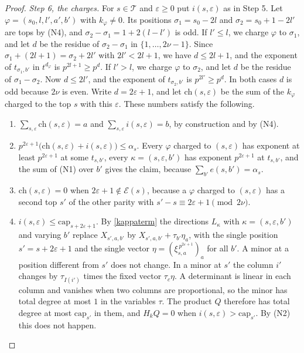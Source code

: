 \begin{proof}
\emph{Step 6, the charges.} For $s\in\mathcal T$ and $\varepsilon\ge0$ put $i(s,\varepsilon)$ as in Step 5. Let $\varphi=(s_0,l,l',a',b')$ with $k_\varphi\ne0$. Its positions $\sigma_1=s_0-2l$ and $\sigma_2=s_0+1-2l'$ are tops by (N4), and $\sigma_2-\sigma_1=1+2(l-l')$ is odd. If $l'\le l$, we charge $\varphi$ to $\sigma_1$, and let $d$ be the residue of $\sigma_2-\sigma_1$ in $\{1,\dots,2\nu-1\}$. Since $\sigma_1+(2l+1)=\sigma_2+2l'$ with $2l'<2l+1$, we have $d\le2l+1$, and the exponent of $t_{\sigma_1,b'}$ in $t^{d_\varphi}$ is $p^{2l+1}\ge p^{d}$. If $l'>l$, we charge $\varphi$ to $\sigma_2$, and let $d$ be the residue of $\sigma_1-\sigma_2$. Now $d\le2l'$, and the exponent of $t_{\sigma_2,b'}$ is $p^{2l'}\ge p^d$. In both cases $d$ is odd because $2\nu$ is even. Write $d=2\varepsilon+1$, and let $\mathrm{ch}(s,\varepsilon)$ be the sum of the $k_\varphi$ charged to the top $s$ with this $\varepsilon$. These numbers satisfy the following.
\begin{enumerate}
\item[(C1)] $\sum_{s,\varepsilon}\mathrm{ch}(s,\varepsilon)=a$ and $\sum_{s,\varepsilon}i(s,\varepsilon)=b$, by construction and by (N4).
\item[(C2)] $p^{2\varepsilon+1}\big(\mathrm{ch}(s,\varepsilon)+i(s,\varepsilon)\big)\le\alpha_s$. Every $\varphi$ charged to $(s,\varepsilon)$ has exponent at least $p^{2\varepsilon+1}$ at some $t_{s,b'}$, every $\kappa=(s,\varepsilon,b')$ has exponent $p^{2\varepsilon+1}$ at $t_{s,b'}$, and the sum of (N1) over $b'$ gives the claim, because $\sum_{b'}e(s,b')=\alpha_s$.
\item[(C3)] $\mathrm{ch}(s,\varepsilon)=0$ when $2\varepsilon+1\notin\mathcal E(s)$, because a $\varphi$ charged to $(s,\varepsilon)$ has a second top $s'$ of the other parity with $s'-s\equiv2\varepsilon+1\pmod{2\nu}$.
\item[(C4)] $i(s,\varepsilon)\le\mathrm{cap}_{s+2\varepsilon+1}$. By \eqref{kappaterm} the directions $L_\kappa$ with $\kappa=(s,\varepsilon,b')$ and varying $b'$ replace $X_{s',a,b'}$ by $X_{s',a,b'}+\tau_{b'}\eta_a$, with the single position $s'=s+2\varepsilon+1$ and the single vector $\eta=(\xi_{s,a}^{\,p^{2\varepsilon+1}})_a$ for all $b'$. A minor at a position different from $s'$ does not change. In a minor at $s'$ the column $i'$ changes by $\tau_{I(i')}$ times the fixed vector $\tau_c\eta$. A determinant is linear in each column and vanishes when two columns are proportional, so the minor has total degree at most $1$ in the variables $\tau$. The product $Q$ therefore has total degree at most $\mathrm{cap}_{s'}$ in them, and $H_kQ=0$ when $i(s,\varepsilon)>\mathrm{cap}_{s'}$. By (N2) this does not happen.
\end{enumerate}


\end{proof}
